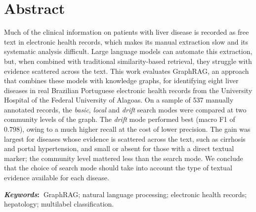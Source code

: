 \chapter*{Abstract}

\noindent Much of the clinical information on patients with liver disease is recorded as free text in electronic health records, which makes its manual extraction slow and its systematic analysis difficult. Large language models can automate this extraction, but, when combined with traditional similarity-based retrieval, they struggle with evidence scattered across the text. This work evaluates GraphRAG, an approach that combines these models with knowledge graphs, for identifying eight liver diseases in real Brazilian Portuguese electronic health records from the University Hospital of the Federal University of Alagoas. On a sample of 537 manually annotated records, the \textit{basic}, \textit{local} and \textit{drift} search modes were compared at two community levels of the graph. The \textit{drift} mode performed best (macro F1 of 0.798), owing to a much higher recall at the cost of lower precision. The gain was largest for diseases whose evidence is scattered across the text, such as cirrhosis and portal hypertension, and small or absent for those with a direct textual marker; the community level mattered less than the search mode. We conclude that the choice of search mode should take into account the type of textual evidence available for each disease.

\vspace{5mm}
\noindent\textbf{\textit{Keywords}:~}GraphRAG; natural language processing; electronic health records; hepatology; multilabel classification.
